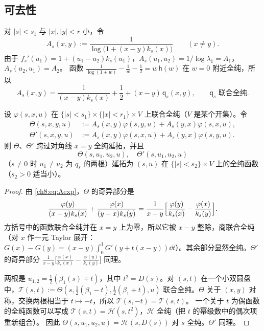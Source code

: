\subsection{可去性}
对 $|s|<s_1$ 与 $|x|,|y|<r$ 小，令
\[
 A_s(x,y):=\frac1{\log\bigl(1+(x-y)k_s(x)\bigr)}\qquad(x\ne y).
\]
由于 $f_s'(u_1)=1+(u_1-u_2)k_s(u_1)$，$A_s(u_1,u_2)=1/\log\lambda_1=A_1$，$A_s(u_2,u_1)=A_2$。
函数 $\frac1{\log(1+w)}-\frac1w-\frac12=w\,\mathsf h(w)$ 在 $w=0$ 附近全纯，所以
\begin{equation}\label{ch8:eq:Aexp}
 A_s(x,y)=\frac1{(x-y)k_s(x)}+\frac12+(x-y)\,\mathsf q_s(x,y),\qquad \mathsf q_s\text{ 联合全纯}.
\end{equation}

\begin{lemma}[可去性]\label{ch8:lem:removable}
设 $\varphi(s,x,u)$ 在 $\{|s|<s_1\}\times\{|x|<r_1\}\times V$ 上联合全纯（$V$ 是某个开集）。令
\[
\begin{aligned}
 \Theta(s,x,y,u)&:=A_s(x,y)\varphi(s,y,u)+A_s(y,x)\varphi(s,x,u),\\
 \Theta'(s,x,y,u)&:=A_s(x,y)\varphi(s,x,u)+A_s(y,x)\varphi(s,y,u).
\end{aligned}
\]
则 $\Theta$、$\Theta'$ 跨过对角线 $x=y$ 全纯延拓，并且
\[
 \Theta(s,u_1,u_2,u),\quad\Theta'(s,u_1,u_2,u)
\]
（$s\ne0$ 时 $u_1\ne u_2$ 为 $q_s$ 的两根）延拓为 $(s,u)$ 在 $\{|s|<s_2\}\times V$ 上的全纯函数（$s_2>0$ 适当小）。
\end{lemma}

\begin{proof}
由 \eqref{ch8:eq:Aexp}，$\Theta$ 的奇异部分是
\[
 \frac{\varphi(y)}{(x-y)k_s(x)}+\frac{\varphi(x)}{(y-x)k_s(y)}=\frac1{x-y}\Bigl[\frac{\varphi(y)}{k_s(x)}-\frac{\varphi(x)}{k_s(y)}\Bigr].
\]
方括号中的函数联合全纯并在 $x=y$ 上为零，所以它被 $x-y$ 整除，商联合全纯（对 $x$ 作一元 Taylor 展开：
$G(x)-G(y)=(x-y)\int_0^1G'(y+t(x-y))\dd t$）。其余部分显然全纯。$\Theta'$ 的奇异部分
$\frac1{x-y}\bigl[\frac{\varphi(x)}{k_s(x)}-\frac{\varphi(y)}{k_s(y)}\bigr]$ 同理。

两根是 $u_{1,2}=\frac12(\beta_1(s)\mp t)$，其中 $t^2=D(s)$。对 $(s,t)$ 在一个小双圆盘中，$\mathcal T(s,t):=\Theta(s,\tfrac12(\beta_1-t),\tfrac12(\beta_1+t),u)$
联合全纯。$\Theta$ 关于 $(x,y)$ 对称，交换两根相当于 $t\mapsto-t$，所以 $\mathcal T(s,-t)=\mathcal T(s,t)$。
一个关于 $t$ 为偶函数的全纯函数可以写成 $\mathcal T(s,t)=\mathcal H(s,t^2)$，$\mathcal H$ 全纯（把 $t$ 的幂级数中的偶次项重新组合）。
因此 $\Theta(s,u_1,u_2,u)=\mathcal H(s,D(s))$ 对 $s$ 全纯。$\Theta'$ 同理。
\end{proof}

